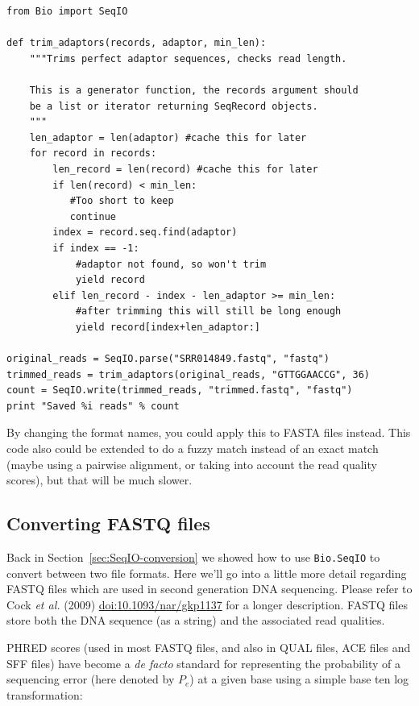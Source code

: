 \documentclass{report}
\begin{document}
\begin{verbatim}
from Bio import SeqIO

def trim_adaptors(records, adaptor, min_len):
    """Trims perfect adaptor sequences, checks read length.
    
    This is a generator function, the records argument should
    be a list or iterator returning SeqRecord objects.
    """
    len_adaptor = len(adaptor) #cache this for later
    for record in records:
        len_record = len(record) #cache this for later
        if len(record) < min_len:
           #Too short to keep
           continue
        index = record.seq.find(adaptor)
        if index == -1:
            #adaptor not found, so won't trim
            yield record
        elif len_record - index - len_adaptor >= min_len:
            #after trimming this will still be long enough
            yield record[index+len_adaptor:]

original_reads = SeqIO.parse("SRR014849.fastq", "fastq")
trimmed_reads = trim_adaptors(original_reads, "GTTGGAACCG", 36)
count = SeqIO.write(trimmed_reads, "trimmed.fastq", "fastq") 
print "Saved %i reads" % count
\end{verbatim}

By changing the format names, you could apply this to FASTA files instead.
This code also could be extended to do a fuzzy match instead of an exact
match (maybe using a pairwise alignment, or taking into account the read
quality scores), but that will be much slower.

\subsection{Converting FASTQ files}
\label{sec:SeqIO-fastq-conversion}

Back in Section~\ref{sec:SeqIO-conversion} we showed how to use
\verb|Bio.SeqIO| to convert between two file formats. Here we'll go into a
little more detail regarding FASTQ files which are used in second generation
DNA sequencing. Please refer to Cock \textit{et al.} (2009)
\href{http://dx.doi.org/10.1093/nar/gkp1137}{doi:10.1093/nar/gkp1137} for
a longer description. FASTQ files store both the DNA sequence (as a string)
and the associated read qualities. 

PHRED scores (used in most FASTQ files, and also in QUAL files, ACE files
and SFF files) have become a \textit{de facto} standard for representing
the probability of a sequencing error (here denoted by $P_e$) at a given
base using a simple base ten log transformation:
\end{document}
